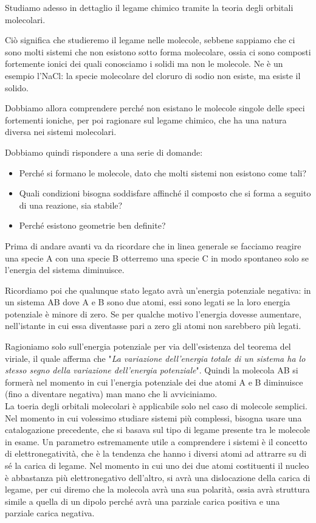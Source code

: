 Studiamo adesso in dettaglio il legame chimico tramite la teoria degli orbitali molecolari.

Ciò significa che studieremo il legame nelle molecole, sebbene sappiamo che ci sono molti sistemi che non esistono sotto forma molecolare, ossia ci sono composti fortemente ionici dei quali conosciamo i solidi ma non le molecole. Ne è un esempio l'NaCl: la specie molecolare del cloruro di sodio non esiste, ma esiste il solido.

Dobbiamo allora comprendere perché non esistano le molecole singole delle speci fortementi ioniche, per poi ragionare sul legame chimico, che ha una natura diversa nei sistemi molecolari.

Dobbiamo quindi rispondere a una serie di domande:
\begin{itemize}
    \item Perché si formano le molecole, dato che molti sistemi non esistono come tali?
    \item Quali condizioni bisogna soddisfare affinché il composto che si forma a seguito di una reazione, sia stabile?
    \item Perché esistono geometrie ben definite?
\end{itemize}
Prima di andare avanti va da ricordare che in linea generale se facciamo reagire una specie A con una specie B otterremo una specie C in modo spontaneo solo se l'energia del sistema diminuisce. 

Ricordiamo poi che qualunque stato legato avrà un'energia potenziale negativa: in un sistema AB dove A e B sono due atomi, essi sono legati se la loro energia potenziale è minore di zero. Se per qualche motivo l'energia dovesse aumentare, nell'istante in cui essa diventasse pari a zero gli atomi non sarebbero più legati.

Ragioniamo solo sull'energia potenziale per via dell'esistenza del teorema del viriale, il quale afferma che "\textit{La variazione dell'energia totale di un sistema ha lo stesso segno della variazione dell'energia potenziale}". Quindi la molecola AB si formerà nel momento in cui l'energia potenziale dei due atomi A e B diminuisce (fino a diventare negativa) man mano che li avviciniamo.\\

La toeria degli orbitali molecolari è applicabile solo nel caso di molecole semplici. Nel momento in cui volessimo studiare sistemi più complessi, bisogna usare una catalogazione precedente, che si basava sul tipo di legame presente tra le molecole in esame.
Un parametro estremamente utile a comprendere i sistemi è il concetto di elettronegatività, che è la tendenza che hanno i diversi atomi ad attrarre su di sé la carica di legame. Nel momento in cui uno dei due atomi costituenti il nucleo è abbastanza più elettronegativo dell'altro, si avrà una dislocazione della carica di legame, per cui diremo che la molecola avrà una sua polarità, ossia avrà struttura simile a quella di un dipolo perché avrà una parziale carica positiva e una parziale carica negativa.

